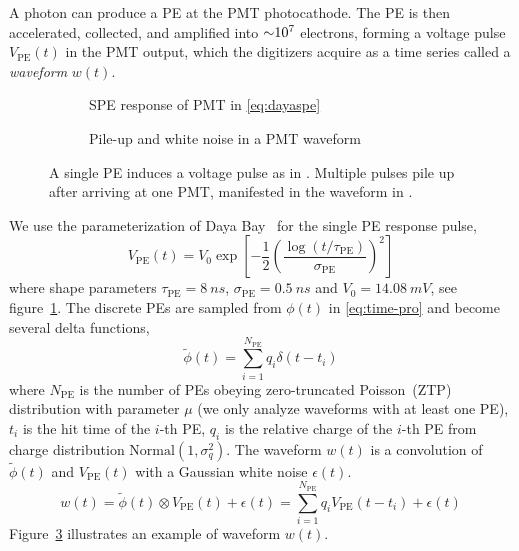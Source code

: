 A photon can produce a PE at the PMT photocathode. The PE is then accelerated, collected, and amplified into $\num[retain-unity-mantissa=false]{\sim 1e7}$ electrons, forming a voltage pulse $V_\mathrm{PE}(t)$ in the PMT output, which the digitizers acquire as a time series called a \textit{waveform} $w(t)$. 

\begin{figure}[H]
  \begin{subfigure}{.49\textwidth}
    \centering
    \resizebox{\textwidth}{!}{}
    \caption{\label{fig:spe} SPE response of PMT in \eqref{eq:dayaspe}}
  \end{subfigure}
  \begin{subfigure}{.49\textwidth}
    \centering
    \resizebox{\textwidth}{!}{}
    \caption{\label{fig:pile} Pile-up and white noise in a PMT waveform}
  \end{subfigure}
  \caption{A single PE induces a voltage pulse as in . Multiple pulses pile up after arriving at one PMT, manifested in the waveform in .}
\end{figure}

We use the parameterization of Daya Bay~\cite{jetter_pmt_2012} for the single PE response pulse,
\begin{equation}
  V_\mathrm{PE}(t) = V_{0}\exp\left[-\frac{1}{2}\left(\frac{\log(t/\tau_\mathrm{PE})}{\sigma_\mathrm{PE}}\right)^{2}\right]
  \label{eq:dayaspe}
\end{equation}
where shape parameters $\tau_\mathrm{PE}=\SI{8}{ns}$, $\sigma_\mathrm{PE}=\SI{0.5}{ns}$ and $V_{0}=\SI{14.08}{mV}$, see figure~\ref{fig:spe}. The discrete PEs are sampled from $\phi(t)$ in \eqref{eq:time-pro} and become several delta functions, 
\begin{equation}
  \label{eq:lc-sample}
  \tilde{\phi}(t) = \sum_{i=1}^{N_{\mathrm{PE}}} q_i \delta(t-t_i)
\end{equation}
where $N_\mathrm{PE}$ is the number of PEs obeying zero-truncated Poisson~(ZTP) distribution with parameter $\mu$ (we only analyze waveforms with at least one PE), $t_i$ is the hit time of the $i$-th PE, $q_i$ is the relative charge of the $i$-th PE from charge distribution $\mathrm{Normal}(1,\sigma_{q}^2)$. The waveform $w(t)$ is a convolution of $\tilde{\phi}(t)$ and $V_\mathrm{PE}(t)$ with a Gaussian white noise $\epsilon(t)$.
\begin{equation}
  \label{eq:1}
  w(t) = \tilde{\phi}(t) \otimes V_\mathrm{PE}(t) + \epsilon(t) = \sum_{i=1}^{N_\mathrm{PE}} q_i V_\mathrm{PE}(t-t_i) + \epsilon(t)
\end{equation}
Figure~\ref{fig:pile} illustrates an example of waveform $w(t)$. 

